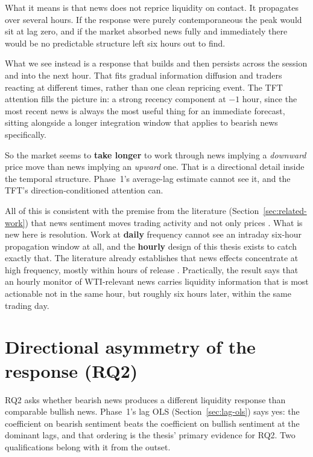 What it means is that news does not reprice liquidity on contact. It propagates over several hours. If the response were purely contemporaneous the peak would sit at lag zero, and if the market absorbed news fully and immediately there would be no predictable structure left six hours out to find.

What we see instead is a response that builds and then persists across the session and into the next hour. That fits gradual information diffusion and traders reacting at different times, rather than one clean repricing event. The TFT attention fills the picture in: a strong recency component at $-1$ hour, since the most recent news is always the most useful thing for an immediate forecast, sitting alongside a longer integration window that applies to bearish news specifically.

So the market seems to \textbf{take longer} to work through news implying a \emph{downward} price move than news implying an \emph{upward} one. That is a directional detail inside the temporal structure. Phase~1's average-lag estimate cannot see it, and the TFT's direction-conditioned attention can.

All of this is consistent with the premise from the literature (Section~\ref{sec:related-work}) that news sentiment moves trading activity and not only prices \citep{tetlock2007}. What is new here is resolution. Work at \textbf{daily} frequency cannot see an intraday six-hour propagation window at all, and the \textbf{hourly} design of this thesis exists to catch exactly that. The literature already establishes that news effects concentrate at high frequency, mostly within hours of release \citep{ederington1993}. Practically, the result says that an hourly monitor of WTI-relevant news carries liquidity information that is most actionable not in the same hour, but roughly six hours later, within the same trading day.

\section{Directional asymmetry of the response (RQ2)}\label{sec:rq2-discussion}

RQ2 asks whether bearish news produces a different liquidity response than comparable bullish news. Phase~1's lag OLS (Section~\ref{sec:lag-ols}) says yes: the coefficient on bearish sentiment beats the coefficient on bullish sentiment at the dominant lags, and that ordering is the thesis' primary evidence for RQ2. Two qualifications belong with it from the outset.


